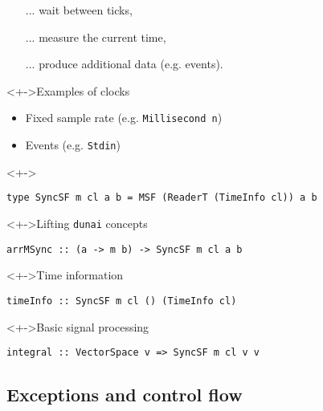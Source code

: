 \documentclass[handout]{enigtex-beamer-base}
\begin{document}
\begin{frame}[fragile]
\begin{itemize}
	\item[...] wait between ticks,
	\item[...] measure the current time,
	\item[...] produce additional data (e.g. events).
\end{itemize}

\begin{block}<+->{Examples of clocks}
\begin{itemize}
	\item Fixed sample rate (e.g. \texttt{Millisecond n})
	\item Events (e.g. \texttt{Stdin})
\end{itemize}
\end{block}
\end{frame}


\begin{frame}[fragile]
\begin{block}<+->{}
\begin{verbatim}
type SyncSF m cl a b = MSF (ReaderT (TimeInfo cl)) a b
\end{verbatim}
\end{block}
\begin{block}<+->{Lifting \texttt{dunai} concepts}
\begin{verbatim}
arrMSync :: (a -> m b) -> SyncSF m cl a b
\end{verbatim}
\end{block}
\begin{block}<+->{Time information}
\begin{verbatim}
timeInfo :: SyncSF m cl () (TimeInfo cl)
\end{verbatim}
\end{block}
\begin{block}<+->{Basic signal processing}
\begin{verbatim}
integral :: VectorSpace v => SyncSF m cl v v
\end{verbatim}
\end{block}
\end{frame}

\subsection{Exceptions and control flow}
\end{document}
